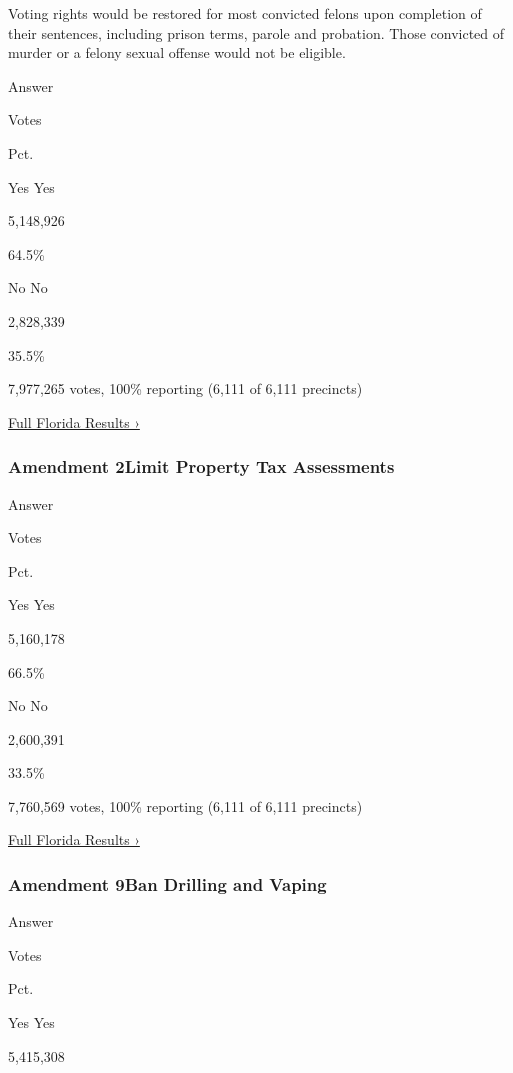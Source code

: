 Voting rights would be restored for most convicted felons upon
completion of their sentences, including prison terms, parole and
probation. Those convicted of murder or a felony sexual offense would
not be eligible.

Answer

Votes

Pct.

 Yes Yes

5,148,926

64.5\%

 No No

2,828,339

35.5\%

7,977,265 votes, 100\% reporting (6,111 of 6,111 precincts)

\href{https://www.nytimes3xbfgragh.onion/interactive/2018/11/06/us/elections/results-florida-elections.html}{Full
Florida Results ›}

\hypertarget{amendment-2limit-property-tax-assessments}{%
\subsubsection{Amendment 2Limit Property Tax
Assessments}\label{amendment-2limit-property-tax-assessments}}

Answer

Votes

Pct.

 Yes Yes

5,160,178

66.5\%

 No No

2,600,391

33.5\%

7,760,569 votes, 100\% reporting (6,111 of 6,111 precincts)

\href{https://www.nytimes3xbfgragh.onion/interactive/2018/11/06/us/elections/results-florida-elections.html}{Full
Florida Results ›}

\hypertarget{amendment-9ban-drilling-and-vaping}{%
\subsubsection{Amendment 9Ban Drilling and
Vaping}\label{amendment-9ban-drilling-and-vaping}}

Answer

Votes

Pct.

 Yes Yes

5,415,308

